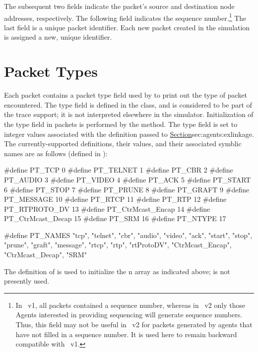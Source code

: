 The subsequent two fields indicate the packet's source and destination
node addresses, respectively.
The following field indicates the sequence number.\footnote{In \ns~v1,
all packets contained a sequence number, whereas in \ns~v2 only those
Agents interested in providing sequencing will generate sequence numbers.
Thus, this field may not be useful in \ns~v2 for packets generated by
agents that have not filled in a sequence number.  It is used here
to remain backward compatible with \ns~v1.}
The last field is a unique packet identifier.  Each new packet
created in the simulation is assigned a new, unique identifier.

\section{Packet Types}
\label{sec:traceptype}

Each packet contains a packet type field used by 
to print out the type of packet encountered.
The type field is defined in the  class, and is considered
to be part of the trace support; it is not interpreted
elsewhere in the simulator.
Initialization of the type field in packets is performed by the
 method.
The type field is set to integer values associated with the
definition passed to
\href{the \code{Agent} constructor}{Section}{sec:agents:exlinkage}.
The currently-supported definitions, their values, and their
associated symblic names are as follows
(defined in ):
\begin{program}
        #define PT_TCP          0
        #define PT_TELNET       1
        #define PT_CBR          2
        #define PT_AUDIO        3
        #define PT_VIDEO        4
        #define PT_ACK          5
        #define PT_START        6
        #define PT_STOP         7
        #define PT_PRUNE        8
        #define PT_GRAFT        9
        #define PT_MESSAGE      10
        #define PT_RTCP         11
        #define PT_RTP          12
        #define PT_RTPROTO_DV   13
        #define PT_CtrMcast_Encap 14
        #define PT_CtrMcast_Decap 15
        #define PT_SRM          16
        #define PT_NTYPE        17

        #define PT_NAMES "tcp", "telnet", "cbr", "audio", "video", "ack", \bs
                "start", "stop", "prune", "graft", "message", "rtcp", "rtp", \bs
                "rtProtoDV", "CtrMcast_Encap", "CtrMcast_Decap", "SRM"
\end{program}
The definition of  is used to initialize the
n array as indicated above;
 is not presently used.

